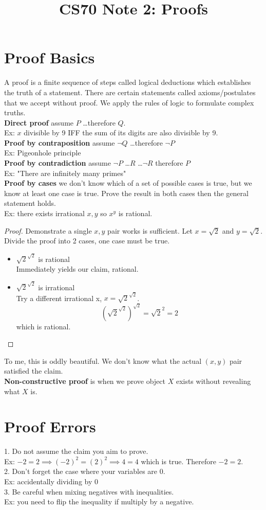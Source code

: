 \documentclass[12pt, letterpaper]{article}
\title{CS70 Note 2: Proofs}
\begin{document}
\maketitle

\section{Proof Basics}
A proof is a finite sequence of steps called logical deductions which establishes the truth of a statement.
There are certain statements called axioms/postulates that we accept without proof.
We apply the rules of logic to formulate complex truths.
\\\textbf{Direct proof} 
assume $P$ \dots therefore $Q$.
\\Ex: $x$ divisible by 9 IFF the sum of its digits are also divisible by 9.
\\\textbf{Proof by contraposition}
assume $\lnot Q$ \dots therefore $\lnot P$
\\Ex: Pigeonhole principle
\\\textbf{Proof by contradiction}
assume $\lnot P$ \dots $R$ \dots $\lnot R$ therefore $P$
\\Ex: "There are infinitely many primes"
\\\textbf{Proof by cases} we don't know which of a set of possible cases
is true, but we know at least one case is true. Prove the result in both cases
then the general statement holds.
\\Ex: there exists irrational $x,y$ so $x^y$ is rational.
\begin{proof}
Demonstrate a single $x,y$ pair works is sufficient. 
Let $x=\sqrt2$ and $y=\sqrt2$. Divide the proof into 2 cases, one case must be true.
\begin{itemize}
  \item $\sqrt2^{\sqrt2}$ is rational
  \\Immediately yields our claim, rational.
  \item $\sqrt2^{\sqrt2}$ is irrational
  \\Try a different irrational x, $x=\sqrt2^{\sqrt2}$.
  $$(\sqrt2^{\sqrt2})^{\sqrt2}=\sqrt2^2=2$$
  which is rational.
\end{itemize}
\end{proof}
To me, this is oddly beautiful. We don't know what the actual $(x,y)$ pair
satisfied the claim.
\\\textbf{Non-constructive proof} is when we prove object $X$ exists without 
revealing what $X$ is. 

\section{Proof Errors}
1. Do not assume the claim you aim to prove.
\\Ex: $-2=2\implies (-2)^2=(2)^2 \implies 4=4$ which is true. Therefore $-2 = 2$.
\\2. Don't forget the case where your variables are 0.
\\Ex: accidentally dividing by 0
\\3. Be careful when mixing negatives with inequalities.
\\Ex: you need to flip the inequality if multiply by a negative.
\end{document}
